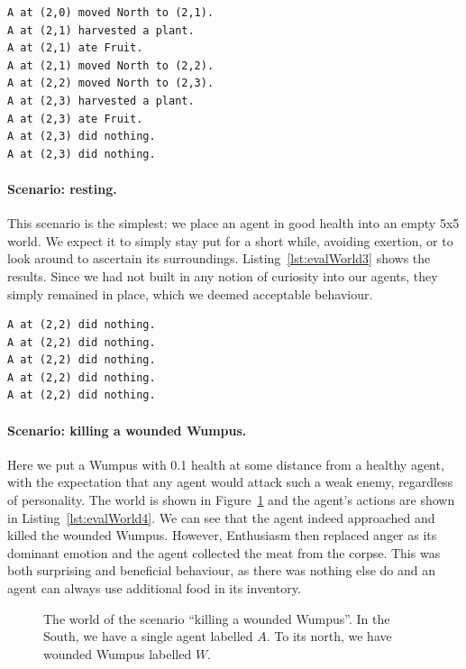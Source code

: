 \noindent
\begin{minipage}{\linewidth}
\begin{lstlisting}[caption=Actions in the scenario ``harvesting all plants''., label=lst:evalWorld2]
A at (2,0) moved North to (2,1).
A at (2,1) harvested a plant.
A at (2,1) ate Fruit.
A at (2,1) moved North to (2,2).
A at (2,2) moved North to (2,3).
A at (2,3) harvested a plant.
A at (2,3) ate Fruit.
A at (2,3) did nothing.
A at (2,3) did nothing.
\end{lstlisting}
\end{minipage}

\paragraph{Scenario: resting.} This scenario is the simplest: we place an agent in good health into an empty 5x5 world. We expect it to simply stay put for a short while, avoiding exertion, or to look around to ascertain its surroundings. Listing~\ref{lst:evalWorld3} shows the results. Since we had not built in any notion of curiosity into our agents, they simply remained in place, which we deemed acceptable behaviour.

\begin{lstlisting}[caption=Actions in the scenario ``resting''., label=lst:evalWorld3]
A at (2,2) did nothing.
A at (2,2) did nothing.
A at (2,2) did nothing.
A at (2,2) did nothing.
A at (2,2) did nothing.
\end{lstlisting}

\paragraph{Scenario: killing a wounded Wumpus.} Here we put a Wumpus with 0.1 health at some distance from a healthy agent, with the expectation that any agent would attack such a weak enemy, regardless of personality. The world is shown in Figure~\ref{fig:evalWorld4} and the agent's actions are shown in Listing~\ref{lst:evalWorld4}. We can see that the agent indeed approached and killed the wounded Wumpus. However, Enthusiasm then replaced anger as its dominant emotion and the agent collected the meat from the corpse. This was both surprising and beneficial behaviour, as there was nothing else do and an agent can always use additional food in its inventory.

\begin{figure}
	\centering
	
	\caption{The world of the scenario ``killing a wounded Wumpus''. In the South, we have a single agent labelled $A$. To its north, we have wounded Wumpus labelled $W$.}
	\label{fig:evalWorld4}
\end{figure}

